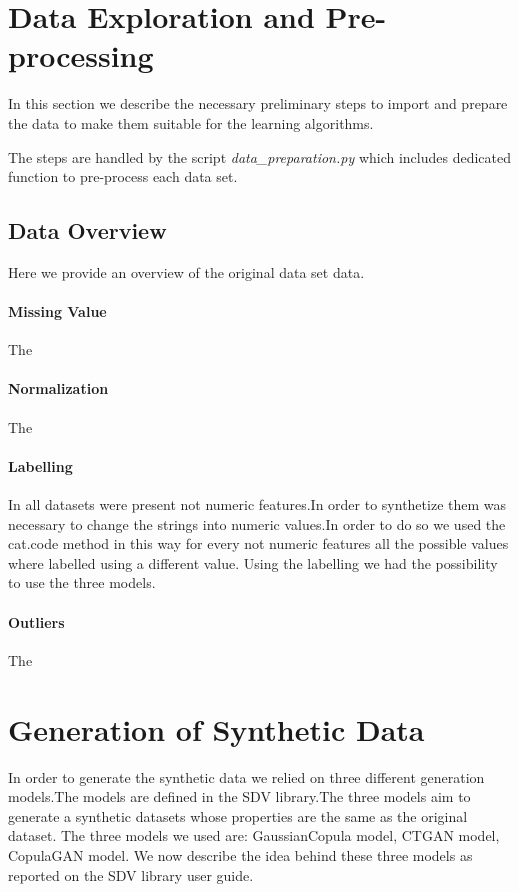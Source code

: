 \documentclass{article}
\begin{document}
\section{Data Exploration and Pre-processing}
In this section we describe the necessary preliminary steps to import and prepare the data to make them suitable for the learning algorithms.

The steps are handled by the script \textit{data\_preparation.py} which includes dedicated function to pre-process each data set.

\subsection{Data Overview}
Here we provide an overview of the original data set data. 

\paragraph{Missing Value}
The 
\paragraph{Normalization}
The 
\paragraph{Labelling}
In all datasets were present not numeric features.In order to synthetize them was necessary to change the strings into numeric values.In order to do so we used the cat.code method in this way for every not numeric features all the possible values where labelled using a different value.
Using the labelling we had the possibility to use the three models.   
\paragraph{Outliers}
The 

\section{Generation of Synthetic Data}
In order to generate the synthetic data we relied on three different generation models.The models are defined in the SDV library.The three models aim to generate a synthetic datasets whose properties are the same as the original dataset.
The three models we used are: GaussianCopula model, CTGAN model, CopulaGAN model.
We now describe the idea behind these three models as reported on the SDV library user guide.
\end{document}
